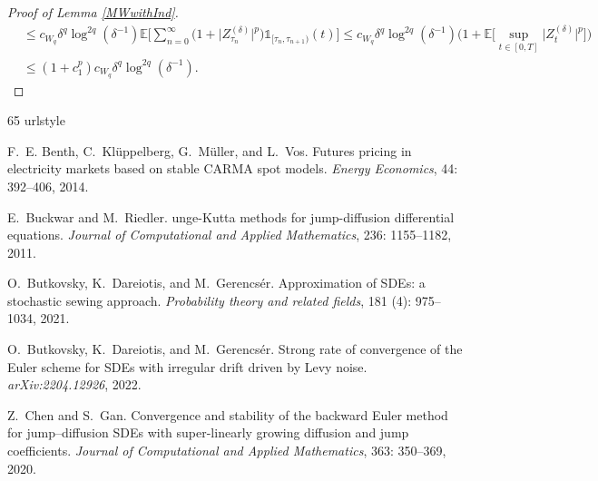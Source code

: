 \documentclass[11pt,a4paper]{article}
\numberwithin{equation}{section}
\theoremstyle{definition}
\newcommand{\E}{{\mathbb{E}}}
\begin{document}
\begin{proof}[Proof of Lemma \ref{MWwithInd}]
\begin{equation}
\begin{aligned}
    &\leq c_{W_q} \delta^q \log^{2q}(\delta^{-1}) \E\Big[\sum_{n=0}^{\infty} \big(1+ \big|Z^{(\delta)}_{\tau_n}\big|^p\big) \mathds{1}_{[\tau_n, \tau_{n+1}) }(t) \Big]
    \leq c_{W_q}  \delta^q \log^{2q}(\delta^{-1}) \Big(1+ \E\big[\sup_{t\in[0,T]} \big|Z^{(\delta)}_{t}\big|^p\big] \Big)\\
    &\leq (1+ c_1^p) c_{W_q}  \delta^q \log^{2q}(\delta^{-1}).
    \end{aligned}
\end{equation}
\end{proof}

\setlength{\bibsep}{0pt plus 0.3ex}
{\footnotesize
\begin{thebibliography}{65}
\providecommand{\natexlab}[1]{#1}
\providecommand{\url}[1]{\texttt{#1}}
\expandafter\ifx\csname urlstyle\endcsname\relax
  \providecommand{\doi}[1]{doi: #1}\else
  \providecommand{\doi}{doi: \begingroup \urlstyle{rm}\Url}\fi

F.~E. Benth, C.~Kl{\"u}ppelberg, G.~M{\"u}ller, and L.~Vos.
\newblock Futures pricing in electricity markets based on stable {CARMA} spot models.
\newblock \emph{Energy Economics}, 44: 392--406, 2014.

E.~Buckwar and M.~Riedler.
unge-{K}utta methods for jump-diffusion differential equations.
\newblock \emph{Journal of Computational and Applied Mathematics}, 236: 1155--1182, 2011.

O.~Butkovsky, K.~Dareiotis, and M.~Gerencs{\'e}r.
\newblock Approximation of {SDE}s: a stochastic sewing approach.
\newblock \emph{Probability theory and related fields}, 181 (4): 975--1034, 2021.

O.~Butkovsky, K.~Dareiotis, and M.~Gerencs{\'e}r.
\newblock Strong rate of convergence of the {E}uler scheme for {SDE}s with irregular drift driven by {L}evy noise.
\newblock \emph{arXiv:2204.12926}, 2022.

Z.~Chen and S.~Gan.
\newblock Convergence and stability of the backward {E}uler method for jump--diffusion {SDE}s with super-linearly growing diffusion and jump coefficients.
\newblock \emph{Journal of Computational and Applied Mathematics}, 363: 350--369, 2020.


\end{thebibliography}}
\end{document}
